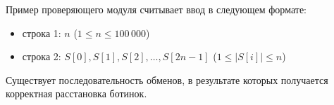Пример проверяющего модуля считывает ввод в следующем формате:
\begin{itemize}
\item строка 1: $n$ ($1 \leq n \leq 100\,000$)
\item строка 2: $S[0], S[1], S[2], \ldots, S[2n-1]$ ($1 \leq |S[i]| \leq n$)
\end{itemize}

Существует последовательность обменов, в результате которых получается корректная расстановка ботинок.